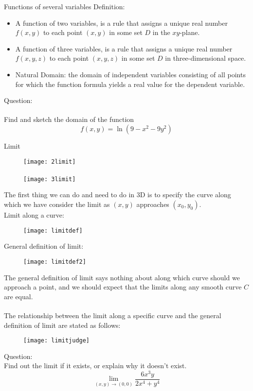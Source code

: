 \documentclass[10pt]{beamer}
\begin{document}
\begin{frame}[allowframebreaks]{Functions of several variables}
Definition:
\begin{itemize}
	\item A function of {\color{red}two} variables, is a rule that assigns a unique real number $f (x, y)$
	to each point $(x, y)$ in some set $D$ in the $xy$-plane.
	\item A function of {\color{red}three} variables, is a rule that assigns a unique real number
	$f (x, y, z)$ to each point $(x, y, z)$ in some set $D$ in three-dimensional space.
	\item {\color{blue}Natural Domain}: the
	domain of independent variables consisting of all points for which the function formula yields a {\color{red}real} value for the
	dependent variable.
\end{itemize}
\noindent 
Question:
\\~
\\{\color{purple} Find and sketch the domain of the function
$$f(x,y) = \ln (9 - x^2 - 9y^2)$$
}


\end{frame}


\begin{frame}[allowframebreaks]{Limit}
	\begin{figure}[H]
		\centering
		\texttt{[image: 2limit]}\\~\\
		\texttt{[image: 3limit]}
	\end{figure}
	The first thing we can do and need to 	do in 3D is to {\color{red}specify the curve along which} we have 	consider the limit as $(x, y)$ approaches $(x_0, y_0)$.
	\newpage
$$$$
	Limit along a curve:
	\begin{figure}[H]
		\centering

		\texttt{[image: limitdef]}
	\end{figure}
	\newpage
	General definition of limit:
	\begin{figure}[H]
		\centering
		
		\texttt{[image: limitdef2]}
	\end{figure}
	The general definition of limit says nothing about along which curve should we approach a point, and we should expect that the limits {\color{red}along any smooth curve} $C$ are {\color{red}equal}.
	\\~\\The relationship between the limit along a specific curve and the general definition of limit are stated as follows:
	\begin{figure}[H]
		\centering
		\texttt{[image: limitjudge]}
	\end{figure}
	\newpage
	{\color{purple}
	Question: 
	\\Find out the limit if it exists, or explain why it doesn't exist.
	$$\lim_{(x,y)\rightarrow (0,0)}\dfrac{6x^3y}{2x^4 + y^4}$$
}
\end{frame}
\end{document}
